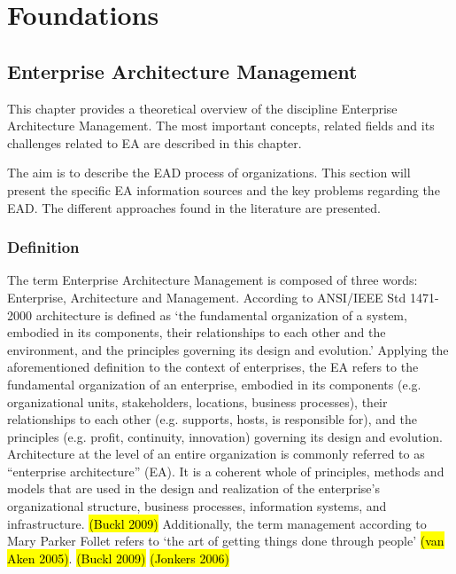
\chapter{Foundations}\label{chapter:foundations}
\section{Enterprise Architecture Management} 

This chapter provides a theoretical overview of the discipline Enterprise Architecture Management. The most important concepts, related fields and its challenges related to EA are described in this chapter.

The aim is to describe the EAD process of organizations. This section will present the specific EA information sources and the key problems regarding the EAD. The different approaches found in the literature are presented.


\subsection{Definition}
The term Enterprise Architecture Management is composed of three words: Enterprise, Architecture and Management.
According to ANSI/IEEE Std 1471-2000 architecture is defined as ‘the fundamental organization of a system, embodied in its components, their relationships to each other and the environment, and the principles governing its design and evolution.’
Applying the aforementioned definition to the context of enterprises, the EA refers to the fundamental organization of an enterprise, embodied in its components (e.g. organizational units, stakeholders, locations, business processes), their relationships to each other (e.g. supports, hosts, is responsible for), and the principles (e.g. profit, continuity, innovation) governing its design and evolution.
Architecture at the level of an entire organization is commonly referred to as “enterprise architecture” (EA). It is a coherent whole of principles, methods and models that are used in the design and realization of the enterprise’s organizational structure, business processes, information systems, and infrastructure.
\hl{(Buckl 2009)}
Additionally, the term management according to Mary Parker Follet refers to ‘the art of getting things done through people’ \hl{(van Aken 2005)}.
\hl{(Buckl 2009)}
\hl{(Jonkers 2006)}

